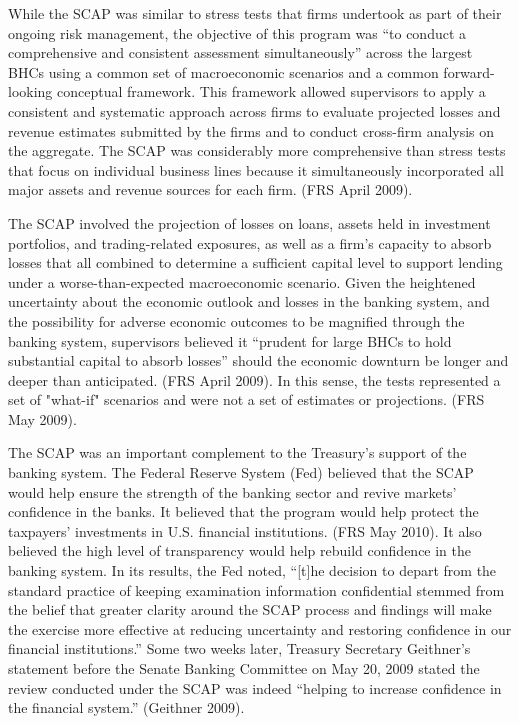 \documentclass[justified, nobib]{tufte-handout2}
\begin{document}
While the SCAP was similar to stress tests that firms undertook as part
of their ongoing risk management, the objective of this program was ``to
conduct a comprehensive and consistent assessment simultaneously''
across the largest BHCs using a common set of macroeconomic scenarios
and a common forward-looking conceptual framework. This framework
allowed supervisors to apply a consistent and systematic approach across
firms to evaluate projected losses and revenue estimates submitted by
the firms and to conduct cross-firm analysis on the aggregate. The SCAP
was considerably more comprehensive than stress tests that focus on
individual business lines because it simultaneously incorporated all
major assets and revenue sources for each firm. (FRS April 2009).

The SCAP involved the projection of losses on loans, assets held in
investment portfolios, and trading-related exposures, as well as a
firm's capacity to absorb losses that all combined to determine a
sufficient capital level to support lending under a worse-than-expected
macroeconomic scenario. Given the heightened uncertainty about the
economic outlook and losses in the banking system, and the possibility
for adverse economic outcomes to be magnified through the banking
system, supervisors believed it ``prudent for large BHCs to hold
substantial capital to absorb losses'' should the economic downturn be
longer and deeper than anticipated. (FRS April 2009). In this sense, the
tests represented a set of "what-if" scenarios and were not a set of
estimates or projections. (FRS May 2009).

The SCAP was an important complement to the Treasury's support of the
banking system. The Federal Reserve System (Fed) believed that the SCAP
would help ensure the strength of the banking sector and revive markets'
confidence in the banks. It believed that the program would help protect
the taxpayers' investments in U.S. financial institutions. (FRS May
2010). It also believed the high level of transparency would help
rebuild confidence in the banking system. In its results, the Fed noted,
``{[}t{]}he decision to depart from the standard practice of keeping
examination information confidential stemmed from the belief that
greater clarity around the SCAP process and findings will make the
exercise more effective at reducing uncertainty and restoring confidence
in our financial institutions.'' Some two weeks later, Treasury
Secretary Geithner's statement before the Senate Banking Committee on
May 20, 2009 stated the review conducted under the SCAP was indeed
``helping to increase confidence in the financial system.'' (Geithner
2009).
\end{document}

